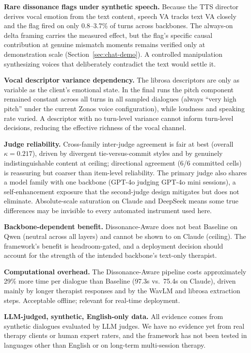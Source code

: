 \textbf{Rare dissonance flags under synthetic speech.} Because the TTS director derives vocal emotion from the text content, speech VA tracks text VA closely and the flag fired on only 0.8--3.7\% of turns across backbones. The always-on delta framing carries the measured effect, but the flag's specific causal contribution at genuine mismatch moments remains verified only at demonstration scale (Section~\ref{sec:chat-demo}). A controlled manipulation synthesizing voices that deliberately contradict the text would settle it.

\textbf{Vocal descriptor variance dependency.} The librosa descriptors are only as variable as the client's emotional state. In the final runs the pitch component remained constant across all turns in all sampled dialogues (always ``very high pitch'' under the current Zonos voice configuration), while loudness and speaking rate varied. A descriptor with no turn-level variance cannot inform turn-level decisions, reducing the effective richness of the vocal channel.

\textbf{Judge reliability.} Cross-family inter-judge agreement is fair at best (overall $\kappa = 0.217$), driven by divergent tie-versus-commit styles and by genuinely indistinguishable content at ceiling; directional agreement (6/6 committed cells) is reassuring but coarser than item-level reliability. The primary judge also shares a model family with one backbone (GPT-4o judging GPT-4o mini sessions), a self-enhancement exposure that the second-judge design mitigates but does not eliminate. Absolute-scale saturation on Claude and DeepSeek means some true differences may be invisible to every automated instrument used here.

\textbf{Backbone-dependent benefit.} Dissonance-Aware does not beat Baseline on Qwen (neutral across all layers) and cannot be shown to on Claude (ceiling). The framework's benefit is headroom-gated, and a deployment decision should account for the strength of the intended backbone's text-only therapist.

\textbf{Computational overhead.} The Dissonance-Aware pipeline costs approximately 29\% more time per dialogue than Baseline (97.3s vs.\ 75.4s on Claude), driven mainly by longer therapist responses and by the WavLM and librosa extraction steps. Acceptable offline; relevant for real-time deployment.

\textbf{LLM-judged, synthetic, English-only data.} All evidence comes from synthetic dialogues evaluated by LLM judges. We have no evidence yet from real therapy clients or human expert raters, and the framework has not been tested in languages other than English or on long-term multi-session therapy.

